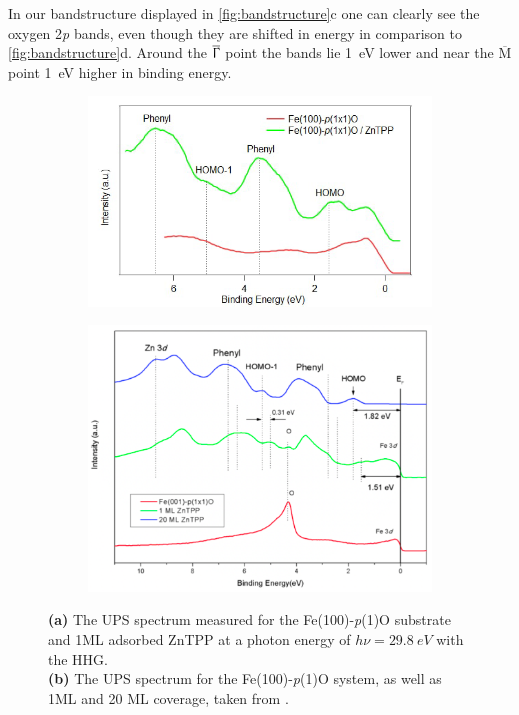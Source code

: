 In our bandstructure displayed in \autoref{fig:bandstructure}c one can clearly see the oxygen 2\textit{p} bands, even though they are shifted in energy in comparison to \autoref{fig:bandstructure}d. Around the $\overline{\Upgamma}$ point the bands lie \qty{1}{eV} lower and near the $\overline{\text{M}}$ point \qty{1}{eV} higher in binding energy.

\begin{figure}[h]
    \centering
    \begin{subfigure}{0.49\textwidth}
        \centering
        \includegraphics[width = \textwidth]{Plots/integrated_spectrum_Fe.png}
        \caption{}
        \label{fig:ups_spectrum}
    \end{subfigure}
    \hfill
    \begin{subfigure}{0.49\textwidth}
        \centering
        \includegraphics[width = \textwidth]{Plots/integrated_spectrum_Fe_lit.png}
        \caption{}
        \label{fig:ups_spectrum_lit}
    \end{subfigure}
    \caption{\textbf{(a)} The UPS spectrum measured for the Fe(100)-\textit{p}(1)O substrate and 1ML adsorbed ZnTPP at a photon energy of $h\nu = \qty{29.8}{eV}$ with the HHG. \\\textbf{(b)} The UPS spectrum for the Fe(100)-\textit{p}(1)O system, as well as 1ML and 20 ML coverage, taken from \cite*{tesi}.}
    \label{fig:ups}
\end{figure}
